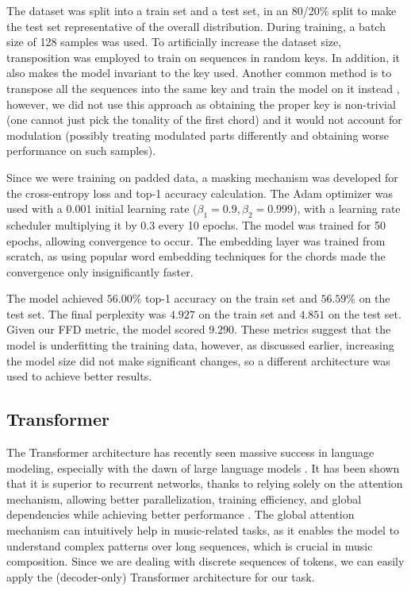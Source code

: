 \documentclass{article}
\begin{document}
The dataset was split into a train set and a test set, in an 80/20\% split to make the test set representative of the overall distribution. During training, a batch size of 128 samples was used. To artificially increase the dataset size, transposition was employed to train on sequences in random keys. In addition, it also makes the model invariant to the key used. Another common method is to transpose all the sequences into the same key and train the model on it instead \cite{DBLP:journals/corr/abs-1709-01620}, however, we did not use this approach as obtaining the proper key is non-trivial (one cannot just pick the tonality of the first chord) and it would not account for modulation (possibly treating modulated parts differently and obtaining worse performance on such samples).

Since we were training on padded data, a masking mechanism was developed for the cross-entropy loss and top-1 accuracy calculation. The Adam optimizer was used with a 0.001 initial learning rate ($\beta_1=0.9, \beta_2=0.999$), with a learning rate scheduler multiplying it by 0.3 every 10 epochs. The model was trained for 50 epochs, allowing convergence to occur. The embedding layer was trained from scratch, as using popular word embedding techniques for the chords made the convergence only insignificantly faster.

The model achieved $56.00\%$ top-1 accuracy on the train set and $56.59\%$ on the test set. The final perplexity was $4.927$ on the train set and $4.851$ on the test set. Given our FFD metric, the model scored $9.290$. These metrics suggest that the model is underfitting the training data, however, as discussed earlier, increasing the model size did not make significant changes, so a different architecture was used to achieve better results.

\subsection{Transformer} \label{Transformer}

The Transformer architecture has recently seen massive success in language modeling, especially with the dawn of large language models \cite{brown2020language, JMLR:v24:22-1144, touvron2023llama, workshop2023bloom}. It has been shown that it is superior to recurrent networks, thanks to relying solely on the attention mechanism, allowing better parallelization, training efficiency, and global dependencies while achieving better performance \cite{NIPS2017_3f5ee243}. The global attention mechanism can intuitively help in music-related tasks, as it enables the model to understand complex patterns over long sequences, which is crucial in music composition. Since we are dealing with discrete sequences of tokens, we can easily apply the (decoder-only) Transformer architecture for our task.
\end{document}
